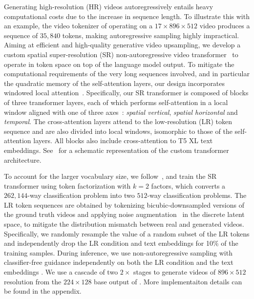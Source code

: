 Generating high-resolution (HR) videos autoregressively entails heavy computational costs due to the increase in sequence length.
%
To illustrate this with an example, the video tokenizer of  operating on a $17\times896\times512$ video produces a sequence of $35,840$ tokens, making autoregressive sampling highly impractical.
%
Aiming at efficient and high-quality generative video upsampling, we develop a custom spatial super-resolution (SR) non-autoregressive video transformer~\citep{yu2023magvit} to operate in token space on top of the language model output.
%
To mitigate the computational requirements of the very long sequences involved, and in particular the quadratic memory of the self-attention layers, our design incorporates windowed local attention~\citep{gupta2022maskvit}.
%
Specifically, our SR transformer is composed of blocks of three transformer layers, each of which performs self-attention in a local window aligned with one of three axes~\citep{tu2022maxvit}: \emph{spatial vertical}, \emph{spatial horizontal} and \emph{temporal}.
%
The cross-attention layers attend to the low-resolution (LR) token sequence and are also divided into local windows, isomorphic to those of the self-attention layers.
%
All blocks also include cross-attention to T5 XL text embeddings. See~ for a schematic representation of the custom transformer architecture.

To account for the larger vocabulary size, we follow~\cite{yu2023language}, and train the SR transformer using token factorization with $k=2$ factors, which converts a $262,144$-way classification problem into two $512$-way classification problems. 
%
The LR token sequences are obtained by tokenizing bicubic-downsampled versions of the ground truth videos and applying noise augmentation~\citep{ho2022imagen} in the discrete latent space, to mitigate the distribution mismatch between real and generated videos.
%
Specifically, we randomly resample the value of a random subset of the LR tokens and independently drop the LR condition and text embeddings for 10\% of the training samples. During inference, we use non-autoregressive sampling \citep{chang2022maskgit,yu2023magvit} with classifier-free guidance independently on both the LR condition and the text embeddings \citep{brooks2023instructpix2pix}.
%
We use a cascade of two $2\times$ stages to generate videos of $896\times512$ resolution from the $224\times128$ base output of \modelname{}.
%
More implementaiton details can be found in the appendix. 

